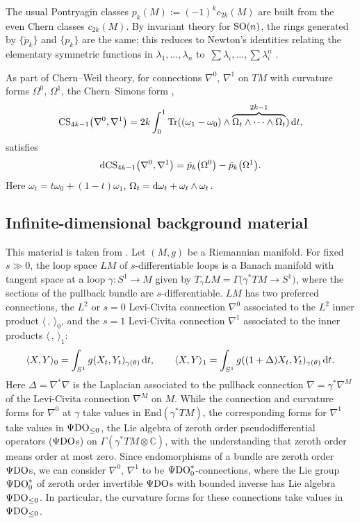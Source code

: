 \documentclass[pdftex]{sigma}
\numberwithin{equation}{section}
\theoremstyle{definition}
\newcommand{\BbC}{{\mathbb C}}
\newcommand{\pdo}{\Psi{\rm DO}}
\newcommand{\C}{\BbC}
\newcommand{\Tr}{{\rm Tr}}
\newcommand{\tp}{\tilde p}
\begin{document}
The usual Pontryagin classes $p_k(M) := (-1)^k c_{2k}(M)$ are built from the even Chern classes $c_{2k}(M)$.
By invariant theory for ${\rm SO}(n)$, the rings generated by $\{\tp_{k}\}$ and
$\{p_{k}\}$ are the same; this reduces to Newton's identities relating the elementary symmetric functions in $\lambda_1,
\dots ,\lambda_n$ to~$\sum \lambda_i,\dots,\sum \lambda_i^n$ \cite[Section~16]{milnor}.

As part of Chern--Weil theory, for connections $\nabla^0$, $\nabla^1$ on $TM$
with curvature forms $\Omega^0$, $\Omega^1$, the Chern--Simons form
,
\[{\rm CS}_{4k-1}\bigl(\nabla^0,\nabla^1\bigr) = 2k\int_0^1 \Tr((\omega_1 - \omega_0)\wedge \overbrace{\Omega_t
\wedge\cdots\wedge\Omega_t}^{2k-1}) \, {\rm d}t,\]
 satisfies
\begin{equation}\label{dcs} {\rm dCS}_{4k-1}\bigl(\nabla^0,\nabla^1\bigr) = \tp_k\bigl(\Omega^0\bigr) - \tp_k\bigl(\Omega^1\bigr).
\end{equation}
Here $\omega_t =t\omega_0+(1-t)\omega_1$, $\Omega_t = {\rm d}\omega_t+\omega_t\wedge\omega_t$.

\subsection{Infinite-dimensional background material}%
This material is taken from \cite{MRT3, MRT4}. Let $(M,g)$ be a Riemannian manifold. For fixed $s\gg 0$, the loop space $LM$ of $s$-differentiable loops is a Banach manifold with tangent space at a loop $\gamma\colon S^1\to M$ given by $T_\gamma LM =\Gamma\bigl(\gamma^*TM\to S^1\bigr)$, where the sections of the pullback bundle are
$s$-differentiable. $LM$
has two preferred connections, the $L^2$ or $s=0$ Levi-Civita connection $\nabla^0$ associated to the $L^2$ inner product $\langle\, ,\, \rangle_0$, and the $s=1$ Levi-Civita connection $\nabla^1$ associated to the inner products
$\langle\, ,\, \rangle_1$:
\[\langle X,Y\rangle_0 = \int_{S^1} g(X_t,Y_t)_{\gamma(\theta)}\, {\rm d}t,\qquad
\langle X,Y\rangle_1 = \int_{S^1} g((1+ \Delta)X_t,Y_t)_{\gamma(\theta)}\, {\rm d}t.\]
Here
$\Delta = \nabla^*\nabla$ is the Laplacian associated to the pullback connection $\nabla = \gamma^*\nabla^M$ of the Levi-Civita connection $\nabla^M$ on $M$. While the connection and curvature forms for $\nabla^0$
at $\gamma$ take values in End$(\gamma^*TM)$, the corresponding forms for $\nabla^1$ take values in
$\pdo_{\leq 0}$, the Lie algebra of zeroth
order
pseudodifferential operators ($\pdo$s) on $\Gamma(\gamma^*TM\otimes \C)$, with the understanding that zeroth order means order at most zero. Since endomorphisms of a bundle are zeroth order $\pdo$s, we can consider $\nabla^0$, $\nabla^1$ to be $\pdo_0^*$-connections, where the Lie group
$\pdo_0^*$ of zeroth order invertible $\pdo$s with bounded inverse has Lie algebra $\pdo_{\leq 0}$.
 In particular, the curvature forms for these connections take values in $\pdo_{\leq 0}$.
\end{document}
